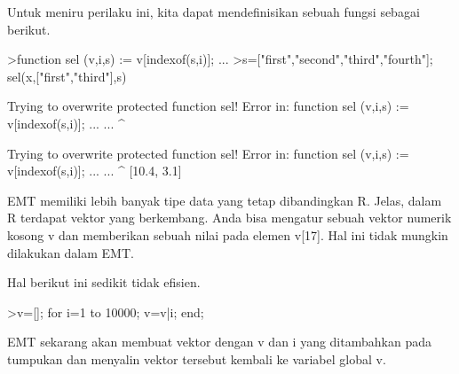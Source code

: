 \documentclass[12pt,Times new roman,letterpaper]{book}
\begin{document}
\begin{eulernootebook}
\begin{eulercomment}
\begin{eulercomment}
\begin{eulernootebook}
\begin{eulercomment}
\begin{eulercomment}
\begin{eulercomment}
\begin{eulercomment}
\begin{eulercomment}
\begin{eulercomment}
\begin{eulercomment}
\begin{eulercomment}
\begin{eulercomment}
\begin{eulercomment}
\begin{eulercomment}
\begin{eulercomment}
Untuk meniru perilaku ini, kita dapat mendefinisikan sebuah fungsi
sebagai berikut.
\end{eulercomment}
\begin{eulerprompt}
>function sel (v,i,s) := v[indexof(s,i)]; ...
>s=["first","second","third","fourth"]; sel(x,["first","third"],s)
\end{eulerprompt}
\begin{euleroutput}
  
  Trying to overwrite protected function sel!
  Error in:
  function sel (v,i,s) := v[indexof(s,i)]; ... ...
               ^
  
  Trying to overwrite protected function sel!
  Error in:
  function sel (v,i,s) := v[indexof(s,i)]; ... ...
               ^
  [10.4,  3.1]
\end{euleroutput}
\begin{eulercomment}
EMT memiliki lebih banyak tipe data yang tetap dibandingkan R. Jelas,
dalam R terdapat vektor yang berkembang. Anda bisa mengatur sebuah
vektor numerik kosong v dan memberikan sebuah nilai pada elemen v[17].
Hal ini tidak mungkin dilakukan dalam EMT.

Hal berikut ini sedikit tidak efisien.
\end{eulercomment}
\begin{eulerprompt}
>v=[]; for i=1 to 10000; v=v|i; end;
\end{eulerprompt}
\begin{eulercomment}
EMT sekarang akan membuat vektor dengan v dan i yang ditambahkan pada
tumpukan dan menyalin vektor tersebut kembali ke variabel global v.


\end{eulercomment}
\end{eulercomment}
\end{eulercomment}
\end{eulercomment}
\end{eulercomment}
\end{eulercomment}
\end{eulercomment}
\end{eulercomment}
\end{eulercomment}
\end{eulercomment}
\end{eulercomment}
\end{eulercomment}
\end{eulernootebook}
\end{eulercomment}
\end{eulercomment}
\end{eulernootebook}
\end{document}
